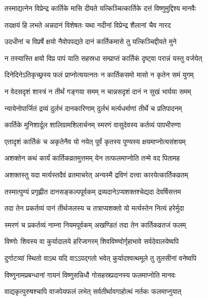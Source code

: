 \twolineshloka
{तस्माद्यत्नेन विप्रेन्द्र कार्तिके मासि दीयते}
{यत्किञ्चित्कार्तिके दत्तं विष्णुमुद्दिश्य मानवैः} %

\twolineshloka
{तदक्षयं हि लभते अन्नदानं विशेषतः}
{यथा नदीनां विप्रेन्द्र शैलानां चैव नारद} %

\twolineshloka
{उदधीनां च विप्रर्षे क्षयो नैवोपपद्यते}
{दानं कार्तिकमासे तु यत्किञ्चिद्दीयते मुने} %

\twolineshloka
{न तस्यास्ति क्षयो विप्र पापं याति सहस्रधा}
{सम्प्राप्तं कार्तिकं दृष्ट्वा परान्नं यस्तु वर्जयेत्} %

\twolineshloka
{दिनेदिनेऽतिकृच्छ्रस्य फलं प्राप्नोत्ययत्नतः}
{न कार्तिकसमो मासो न कृतेन समं युगम्} %

\twolineshloka
{न वेदसदृशं शास्त्रं न तीर्थं गङ्गया समम्}
{न चान्नसदृशं दानं न सुखं भार्यया समम्} %

\twolineshloka
{न्यायेनोपार्जितं द्रव्यं दुर्लभं दानकारिणाम्}
{दुर्लभं मर्त्यधर्माणां तीर्थे च प्रतिपादनम्} %

\twolineshloka
{कार्तिके मुनिशार्दूल शालिग्रामशिलार्चनम्}
{स्मरणं वासुदेवस्य कर्तव्यं पापभीरुणा} %

\twolineshloka
{एतादृशं कार्तिकं च अकृतेनैव यो नयेत्}
{पूर्वं कृतस्य पुण्यस्य क्षयमाप्नोत्यसंशयम्} %


\twolineshloka
{अशक्तेन कथं कार्यं कार्तिकव्रतमुत्तमम्}
{येन तत्फलमाप्नोति तन्मे वद पितामह} %


\twolineshloka
{अशक्तस्तु यदा मर्त्यस्तदैवं व्रतमाचरेत्}
{अन्यस्मै द्रविणं दत्त्वा कारयेत्कार्तिकव्रतम्} %

\twolineshloka
{तस्मात्पुण्यं प्रगृह्णीत दानसङ्कल्पपूर्वकम्}
{द्रव्यदानेऽप्यशक्तश्चेद्यदा देवर्षिसत्तम} %

\twolineshloka
{तदा तेन प्रकर्तव्यं पानं तीर्थजलस्य च}
{तत्राप्यशक्तो यो मर्त्यस्तेन नित्यं हरेर्मुदा} %

\twolineshloka
{स्मरणं च प्रकर्तव्यं नाम्ना नियमपूर्वकम्}
{अखण्डितं तदा तेन कार्तिकव्रतजं फलम्} %

\twolineshloka
{विष्णोः शिवस्य वा कुर्यादालये हरिजागरम्}
{शिवविष्ण्वोर्गृहाभावे सर्वदेवालयेष्वपि} %

\twolineshloka
{दुर्गाटव्यां स्थितो वाऽथ यदि वाऽऽपद्गतो भवेत्}
{कुर्यादश्वत्थमूले तु तुलसीनां वनेष्वपि} %

\twolineshloka
{विष्णुनामप्रबन्धानां गायनं विष्णुसन्निधौ}
{गोसहस्रप्रदानस्य फलमाप्नोति मानवः} %

\twolineshloka
{वाद्यकृत्पुरुषश्चापि वाजपेयफलं लभेत्}
{सर्वतीर्थावगाहोत्थं नर्तकः फलमाप्नुयात्} %

